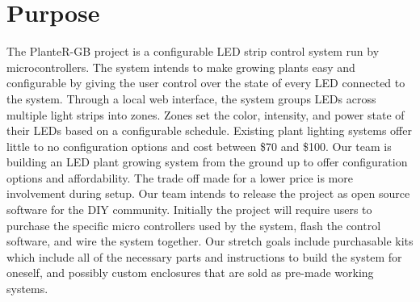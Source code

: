 \documentclass[onecolumn, draftclsnofoot,10pt, compsoc]{IEEEtran}
\begin{document}
\newpage

\tableofcontents
\clearpage
\singlespace

\newpage





%


	\section{Purpose}
	The PlanteR-GB project is a configurable LED strip control system run by microcontrollers.
	The system intends to make growing plants easy and configurable by giving the user control over the state of every LED connected to the system.
	Through a local web interface, the system groups LEDs across multiple light strips into zones.
	Zones set the color, intensity, and power state of their LEDs based on a configurable schedule.
	Existing plant lighting systems offer little to no configuration options and cost between \$70 and \$100. \cite{expensive1} \cite{expensive2} \cite{expensive3}
	Our team is building an LED plant growing system from the ground up to offer configuration options and affordability.
	The trade off made for a lower price is more involvement during setup. Our team intends to release the project as open source software for the DIY 
	community. Initially the project will require users to purchase the specific micro controllers used by the system, flash the control software, and wire 
	the system together. Our stretch goals include purchasable kits which include all of the necessary parts and instructions to build the system for 
	oneself, and possibly custom enclosures that are sold as pre-made working systems.
\end{document}

